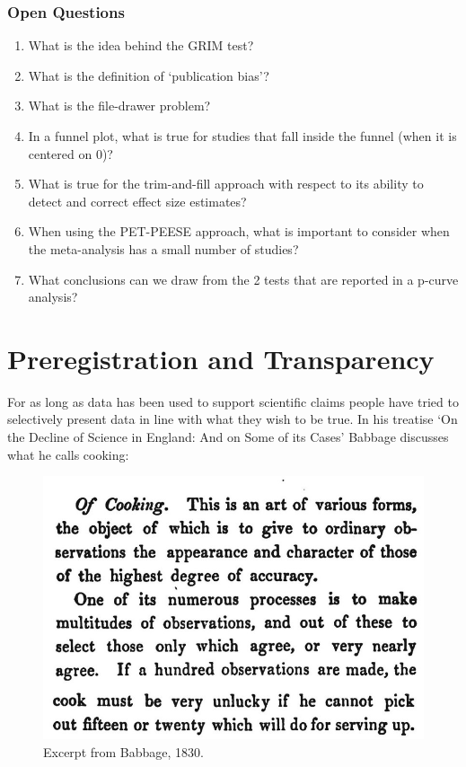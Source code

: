 \documentclass[
  oneside]{book}
\begin{document}
\hypertarget{open-questions-10}{%
\subsection{Open Questions}\label{open-questions-10}}

\begin{enumerate}
\def\labelenumi{\arabic{enumi}.}
\item
  What is the idea behind the GRIM test?
\item
  What is the definition of `publication bias'?
\item
  What is the file-drawer problem?
\item
  In a funnel plot, what is true for studies that fall inside the funnel (when it is centered on 0)?
\item
  What is true for the trim-and-fill approach with respect to its ability to detect and correct effect size estimates?
\item
  When using the PET-PEESE approach, what is important to consider when the meta-analysis has a small number of studies?
\item
  What conclusions can we draw from the 2 tests that are reported in a p-curve analysis?
\end{enumerate}

\hypertarget{prereg}{%
\chapter{Preregistration and Transparency}\label{prereg}}

For as long as data has been used to support scientific claims people have tried to selectively present data in line with what they wish to be true. In his treatise `On the Decline of Science in England: And on Some of its Cases' Babbage \citet{babbage_reflections_1830} discusses what he calls cooking:

\begin{figure}

{\centering \includegraphics[width=1\linewidth]{images/babbage} 

}

\caption{Excerpt from Babbage, 1830.}\label{fig:babbage}
\end{figure}
\end{document}
